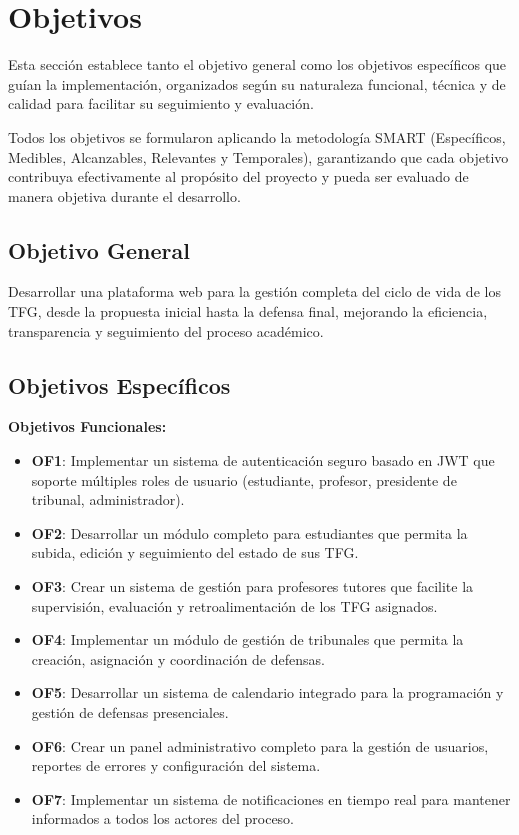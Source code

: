 \documentclass[12pt,a4paper,oneside]{report}
\providecommand{\tightlist}{%
  \setlength{\itemsep}{0pt}\setlength{\parskip}{0pt}}
\begin{document}
\section{Objetivos}\label{objetivos}

Esta sección establece tanto el objetivo general como los objetivos específicos que guían la implementación, organizados según su naturaleza funcional, técnica y de calidad para facilitar su seguimiento y evaluación.

Todos los objetivos se formularon aplicando la metodología SMART (Específicos, Medibles, Alcanzables, Relevantes y Temporales), garantizando que cada objetivo contribuya efectivamente al propósito del proyecto y pueda ser evaluado de manera objetiva durante el desarrollo.

\subsection{Objetivo General}\label{objetivo-general}

Desarrollar una plataforma web para la gestión completa del ciclo de vida de los TFG, desde la propuesta inicial hasta la defensa final, mejorando la eficiencia, transparencia y seguimiento del proceso académico.

\subsection{Objetivos Específicos}\label{objetivos-especuxedficos}

\textbf{Objetivos Funcionales:}

\begin{itemize}
\tightlist
\item
  \textbf{OF1}: Implementar un sistema de autenticación seguro basado en
  JWT que soporte múltiples roles de usuario (estudiante, profesor,
  presidente de tribunal, administrador).
\item
  \textbf{OF2}: Desarrollar un módulo completo para estudiantes que
  permita la subida, edición y seguimiento del estado de sus TFG.
\item
  \textbf{OF3}: Crear un sistema de gestión para profesores tutores que
  facilite la supervisión, evaluación y retroalimentación de los TFG
  asignados.
\item
  \textbf{OF4}: Implementar un módulo de gestión de tribunales que
  permita la creación, asignación y coordinación de defensas.
\item
  \textbf{OF5}: Desarrollar un sistema de calendario integrado para la
  programación y gestión de defensas presenciales.
\item
  \textbf{OF6}: Crear un panel administrativo completo para la gestión
  de usuarios, reportes de errores y configuración del sistema.
\item
  \textbf{OF7}: Implementar un sistema de notificaciones en tiempo real
  para mantener informados a todos los actores del proceso.
\end{itemize}
\end{document}
